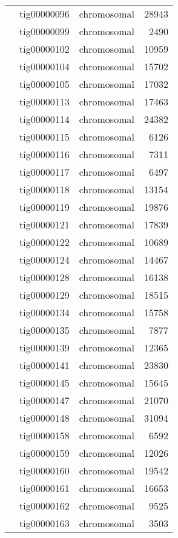 {\begin{supertabular}{llcr}
         & tig00000096 & chromosomal & 28943 \\
         & tig00000099 & chromosomal & 2490 \\
         & tig00000102 & chromosomal & 10959 \\
         & tig00000104 & chromosomal & 15702 \\
         & tig00000105 & chromosomal & 17032 \\
         & tig00000113 & chromosomal & 17463 \\
         & tig00000114 & chromosomal & 24382 \\
         & tig00000115 & chromosomal & 6126 \\
         & tig00000116 & chromosomal & 7311 \\
         & tig00000117 & chromosomal & 6497 \\
         & tig00000118 & chromosomal & 13154 \\
         & tig00000119 & chromosomal & 19876 \\
         & tig00000121 & chromosomal & 17839 \\
         & tig00000122 & chromosomal & 10689 \\
         & tig00000124 & chromosomal & 14467 \\
         & tig00000128 & chromosomal & 16138 \\
         & tig00000129 & chromosomal & 18515 \\
         & tig00000134 & chromosomal & 15758 \\
         & tig00000135 & chromosomal & 7877 \\
         & tig00000139 & chromosomal & 12365 \\
         & tig00000141 & chromosomal & 23830 \\
         & tig00000145 & chromosomal & 15645 \\
         & tig00000147 & chromosomal & 21070 \\
         & tig00000148 & chromosomal & 31094 \\
         & tig00000158 & chromosomal & 6592 \\
         & tig00000159 & chromosomal & 12026 \\
         & tig00000160 & chromosomal & 19542 \\
         & tig00000161 & chromosomal & 16653 \\
         & tig00000162 & chromosomal & 9525 \\
         & tig00000163 & chromosomal & 3503 \\

\end{supertabular}}
